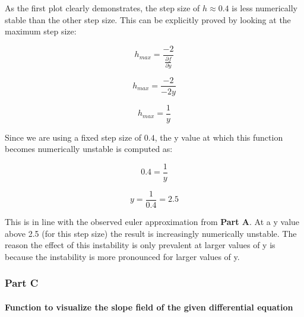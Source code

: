 \documentclass[11pt]{article}
\begin{document}
As the first plot clearly demonstrates, the step size of
\(h\approx 0.4\) is less numerically stable than the other step size.
This can be explicitly proved by looking at the maximum step size:

\[h_{max}=\frac{-2}{\frac{\partial f}{\partial y}}\]

\[h_{max}=\frac{-2}{-2y}\]

\[h_{max}=\frac{1}{y}\]

Since we are using a fixed step size of \(0.4\), the y value at which
this function becomes numerically unstable is computed as:

\[0.4=\frac{1}{y}\]

\[y=\frac{1}{0.4}=2.5\]

This is in line with the observed euler approximation from \textbf{Part
A}. At a y value above 2.5 (for this step size) the result is
increasingly numerically unstable. The reason the effect of this
instability is only prevalent at larger values of y is because the
instability is more pronounced for larger values of y.

\hypertarget{part-c}{%
\subsubsection{Part C}\label{part-c}}

\hypertarget{function-to-visualize-the-slope-field-of-the-given-differential-equation}{%
\paragraph{Function to visualize the slope field of the given
differential
equation}\label{function-to-visualize-the-slope-field-of-the-given-differential-equation}}
\end{document}
